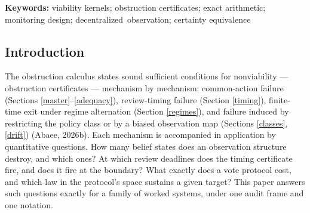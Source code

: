 \documentclass[10pt,twocolumn]{article}
\theoremstyle{definition}
\begin{document}
\begin{abstract}
operation loses exactly the pairs containing the corner state
\((1,1)\). The biased certainty-equivalence law has
drift at least \(21/100\) on \([1,2]\); the bias-free law has drift
identically zero. The benchmark's critical aggregate is \(Y^{*} = 27/5\) (feasible,
margin \(0\)); at the audited obstructed aggregate \(Y = 6\) a
rational dual certificate prices the shortfall at margin \(3/50\). Static duality
holds at value \(-1/10\) on the two-floor instance with an \(\ell_1\)-normalized
Farkas pair, and a Helly-tight triple exhibits the sparse \(m{+}1\)-constraint witness. The complete result tables are carried here: the master table
of all 36 belief pairs against the five kernels, the sixteen sustaining
law pairs of the decentralized protocol (an exact \(4 \times 4\)
product), the 93-cell timing grid, the fifteen-partition census with
each fibre's common safe-action set, and the benchmark and drift tables,
with a five-figure set regenerated from the same scripts. Design rules
follow: review deadlines are boundary-inclusive; merged fibres call for
splits, not threshold tuning; aggregated indices support certainly-safe
reporting only; biased observation maps call for structural correction.
\end{abstract}

\textbf{Keywords:} viability kernels; obstruction certificates; exact
arithmetic; monitoring design; \mbox{decentralized observation}; certainty
equivalence

\subsection{Introduction}\label{introduction}

The obstruction calculus states sound sufficient conditions for
nonviability --- obstruction certificates --- mechanism by mechanism:
common-action failure (Sections \ref{master}--\ref{adequacy}),
review-timing failure (Section \ref{timing}), finite-time exit under
regime alternation (Section \ref{regimes}), and failure induced by
restricting the policy class or by a biased observation map
(Sections \ref{classes}, \ref{drift}) (Abaee, 2026b). Each mechanism is
accompanied in application by quantitative questions. How many belief
states does an observation structure destroy, and which ones? At which
review deadlines does the timing certificate fire, and does it fire at
the boundary? What exactly does a vote protocol cost, and which law in
the protocol's space sustains a given target? This paper answers such
questions exactly for a family of worked systems, under one audit frame
and one notation.
\end{document}
